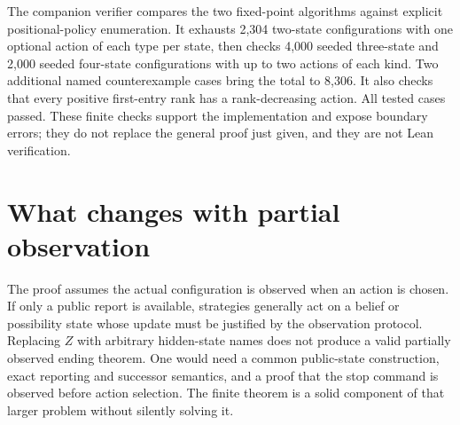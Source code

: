 The companion verifier compares the two fixed-point algorithms against explicit positional-policy enumeration. It exhausts 2,304 two-state configurations with one optional action of each type per state, then checks 4,000 seeded three-state and 2,000 seeded four-state configurations with up to two actions of each kind. Two additional named counterexample cases bring the total to 8,306. It also checks that every positive first-entry rank has a rank-decreasing action. All tested cases passed. These finite checks support the implementation and expose boundary errors; they do not replace the general proof just given, and they are not Lean verification.

\section{What changes with partial observation}
The proof assumes the actual configuration is observed when an action is chosen. If only a public report is available, strategies generally act on a belief or possibility state whose update must be justified by the observation protocol. Replacing $Z$ with arbitrary hidden-state names does not produce a valid partially observed ending theorem. One would need a common public-state construction, exact reporting and successor semantics, and a proof that the stop command is observed before action selection. The finite theorem is a solid component of that larger problem without silently solving it.
